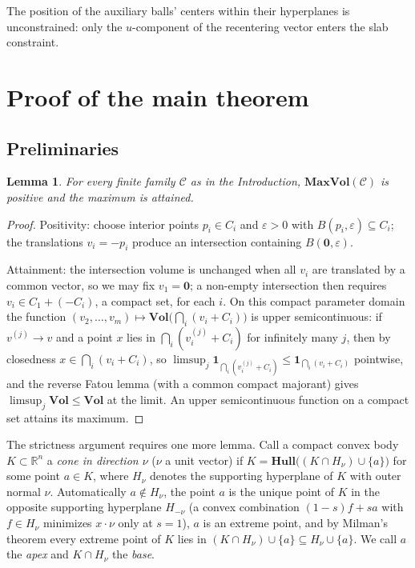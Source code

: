 \documentclass[12pt]{article}
\newtheorem{lemma}[theorem]{Lemma}
\theoremstyle{definition}
\newcommand{\R}{\mathbb{R}}
\newcommand{\Vol}{\mathbf{Vol}}
\newcommand{\Hull}{\mathbf{Hull}}
\newcommand{\MV}{\mathbf{MaxVol}}
\begin{document}
The position of the auxiliary balls' centers within their hyperplanes is
unconstrained: only the $u$-component of the recentering vector enters the
slab constraint.

\section{Proof of the main theorem}\label{sec:main}

\subsection{Preliminaries}

\begin{lemma}\label{lem:attain}
For every finite family $\mathcal{C}$ as in the Introduction,
$\MV(\mathcal{C})$ is positive and the maximum is attained.
\end{lemma}

\begin{proof}
Positivity: choose interior points $p_i\in C_i$ and $\varepsilon>0$ with
$B(p_i,\varepsilon)\subseteq C_i$; the translations $v_i=-p_i$ produce an
intersection containing $B(\mathbf 0,\varepsilon)$.

Attainment: the intersection volume is unchanged when all $v_i$ are
translated by a common vector, so we may fix $v_1=\mathbf 0$; a non-empty
intersection then requires $v_i\in C_1+(-C_i)$, a compact set, for each
$i$.  On this compact parameter domain the function
$(v_2,\ldots,v_m)\mapsto\Vol\bigl(\bigcap_i(v_i+C_i)\bigr)$ is upper
semicontinuous: if $v^{(j)}\to v$ and a point $x$ lies in
$\bigcap_i(v^{(j)}_i+C_i)$ for infinitely many $j$, then by closedness
$x\in\bigcap_i(v_i+C_i)$, so
$\limsup_j\mathbf 1_{\bigcap_i(v^{(j)}_i+C_i)}\le
\mathbf 1_{\bigcap_i(v_i+C_i)}$ pointwise, and the reverse Fatou lemma
(with a common compact majorant) gives
$\limsup_j\Vol\le\Vol$ at the limit.  An upper semicontinuous function on
a compact set attains its maximum.
\end{proof}

The strictness argument requires one more lemma.  Call a compact convex
body $K\subset\R^n$ a {\em cone in direction $\nu$} ($\nu$ a unit
vector) if $K=\Hull\bigl((K\cap H_\nu)\cup\{a\}\bigr)$ for some point
$a\in K$, where $H_\nu$ denotes the supporting hyperplane of $K$ with
outer normal $\nu$.  Automatically $a\notin H_\nu$, the point $a$ is the
unique point of $K$ in the opposite supporting hyperplane $H_{-\nu}$
(a convex combination $(1-s)f+sa$ with $f\in H_\nu$ minimizes
$x\cdot\nu$ only at $s=1$), $a$ is an extreme point, and by Milman's
theorem every extreme point of $K$ lies in $(K\cap H_\nu)\cup\{a\}
\subseteq H_\nu\cup\{a\}$.  We call $a$ the {\em apex} and $K\cap
H_\nu$ the {\em base}.
\end{document}
